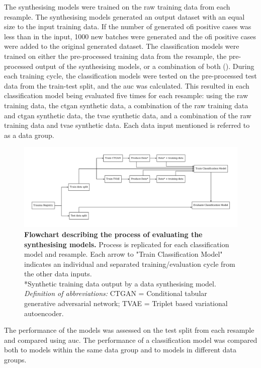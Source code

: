 \documentclass[12pt, a4paper]{article}
\begin{document}
The synthesising models were trained on the raw training data from each resample. The synthesising models generated an output dataset with an equal size to the input training data. If the number of generated \acrshort{ofi} positive cases was less than in the input, 1000 new batches were generated and the \acrshort{ofi} positive cases were added to the original generated dataset. The classification models were trained on either the pre-processed training data from the resample, the pre-processed output of the synthesising models, or a combination of both (). During each training cycle, the classification models were tested on the pre-processed test data from the train-test split, and the \acrshort{auc} was calculated. This resulted in each classification model being evaluated five times for each resample: using the raw training data, the \acrshort{ctgan} synthetic data, a combination of the raw training data and \acrshort{ctgan} synthetic data, the \acrshort{tvae} synthetic data, and a combination of the raw training data and \acrshort{tvae} synthetic data. Each data input mentioned is referred to as a data group.

\begin{figure}
    \centering
    \includegraphics[width=\textwidth]{figures/model_flowchart.pdf}
    \caption{\textbf{Flowchart describing the process of evaluating the synthesising models.} Process is replicated for each classification model and resample. Each arrow to "Train Classification Model" indicates an individual and separated training/evaluation cycle from the other data inputs.\\
        *Synthetic training data output by a data synthesising model.\\
        \textit{Definition of abbreviations:} CTGAN = Conditional tabular generative adversarial network; TVAE = Triplet based variational autoencoder.}
    \label{fig:modelflowchart}
\end{figure}

The performance of the models was assessed on the test split from each resample and compared using \acrshort{auc}. The performance of a classification model was compared both to models within the same data group and to models in different data groups.
\end{document}

